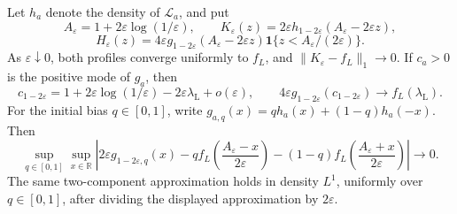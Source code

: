 
\begin{theorem}\label{thm:near-one-profile}
Let $h_a$ denote the density of $\mathcal L_a$, and put
\[
 A_\varepsilon=1+2\varepsilon\log(1/\varepsilon),\qquad
 K_\varepsilon(z)=2\varepsilon
       h_{1-2\varepsilon}(A_\varepsilon-2\varepsilon z),
\]
\[
 H_\varepsilon(z)=4\varepsilon
       g_{1-2\varepsilon}(A_\varepsilon-2\varepsilon z)
       \mathbf1\{z<A_\varepsilon/(2\varepsilon)\}.
\]
As $\varepsilon\downarrow0$, both profiles converge uniformly to $f_L$,
and $\|K_\varepsilon-f_L\|_1\to0$. If $c_a>0$ is the positive mode of $g_a$,
then
\[
 c_{1-2\varepsilon}
   =1+2\varepsilon\log(1/\varepsilon)
      -2\varepsilon\lambda_{\mathrm L}+o(\varepsilon),\qquad
 4\varepsilon g_{1-2\varepsilon}(c_{1-2\varepsilon})
      \longrightarrow f_L(\lambda_{\mathrm L}).
\]
For the initial bias $q\in[0,1]$, write
$g_{a,q}(x)=q h_a(x)+(1-q)h_a(-x)$. Then
\[
 \sup_{q\in[0,1]}\sup_{x\in\mathbb R}
 \left|2\varepsilon g_{1-2\varepsilon,q}(x)
 -q f_L\!\left(\frac{A_\varepsilon-x}{2\varepsilon}\right)
 -(1-q)f_L\!\left(\frac{A_\varepsilon+x}{2\varepsilon}\right)\right|
 \longrightarrow0.
\]
The same two-component approximation holds in density $L^1$, uniformly
over $q\in[0,1]$, after dividing the displayed approximation by
$2\varepsilon$.
\end{theorem}

